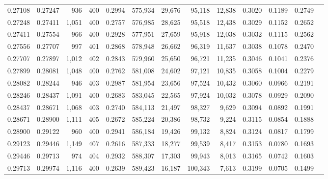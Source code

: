 \begin{tabular}{rrrrrrrrrrrrr}
0.27108 & 0.27247 &   936 & 400 &                                     0.2994 & 575,934 &  29,676 &  95,118 &  12,838 & 0.3020 & 0.1189 & 0.2749 \\
0.27248 & 0.27411 & 1,051 & 400 &                                     0.2757 & 576,985 &  28,625 &  95,518 &  12,438 & 0.3029 & 0.1152 & 0.2652 \\
0.27411 & 0.27554 &   966 & 400 &                                     0.2928 & 577,951 &  27,659 &  95,918 &  12,038 & 0.3032 & 0.1115 & 0.2562 \\
0.27556 & 0.27707 &   997 & 401 &                                     0.2868 & 578,948 &  26,662 &  96,319 &  11,637 & 0.3038 & 0.1078 & 0.2470 \\
0.27707 & 0.27897 & 1,012 & 402 &                                     0.2843 & 579,960 &  25,650 &  96,721 &  11,235 & 0.3046 & 0.1041 & 0.2376 \\
0.27899 & 0.28081 & 1,048 & 400 &                                     0.2762 & 581,008 &  24,602 &  97,121 &  10,835 & 0.3058 & 0.1004 & 0.2279 \\
0.28082 & 0.28244 &   946 & 403 &                                     0.2987 & 581,954 &  23,656 &  97,524 &  10,432 & 0.3060 & 0.0966 & 0.2191 \\
0.28246 & 0.28437 & 1,091 & 400 &                                     0.2683 & 583,045 &  22,565 &  97,924 &  10,032 & 0.3078 & 0.0929 & 0.2090 \\
0.28437 & 0.28671 & 1,068 & 403 &                                     0.2740 & 584,113 &  21,497 &  98,327 &   9,629 & 0.3094 & 0.0892 & 0.1991 \\
0.28671 & 0.28900 & 1,111 & 405 &                                     0.2672 & 585,224 &  20,386 &  98,732 &   9,224 & 0.3115 & 0.0854 & 0.1888 \\
0.28900 & 0.29122 &   960 & 400 &                                     0.2941 & 586,184 &  19,426 &  99,132 &   8,824 & 0.3124 & 0.0817 & 0.1799 \\
0.29123 & 0.29446 & 1,149 & 407 &                                     0.2616 & 587,333 &  18,277 &  99,539 &   8,417 & 0.3153 & 0.0780 & 0.1693 \\
0.29446 & 0.29713 &   974 & 404 &                                     0.2932 & 588,307 &  17,303 &  99,943 &   8,013 & 0.3165 & 0.0742 & 0.1603 \\
0.29713 & 0.29974 & 1,116 & 400 &                                     0.2639 & 589,423 &  16,187 & 100,343 &   7,613 & 0.3199 & 0.0705 & 0.1499 \\

\end{tabular}
